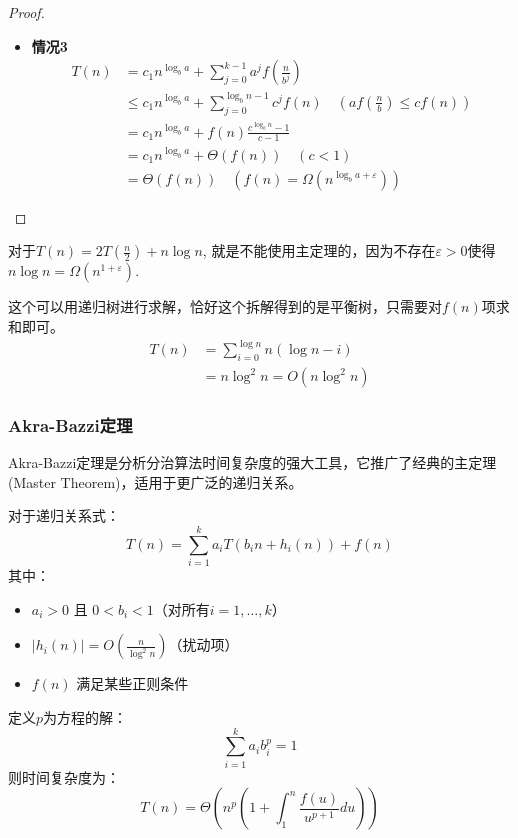\documentclass[./../main.tex]{subfiles} %
\begin{document}
\begin{proof}
\begin{itemize}
        \begin{align*}
            T(n) &= c_{1}n^{\log_{b}a} + \sum_{j=0}^{k-1} a^{j}f\left(\frac{n}{b^{j}}\right) \\
            &= c_{1}n^{\log_{b}a} + \Theta\left(\sum_{j=0}^{\log_{b}n-1} a^{j}\left(\frac{n}{b^{j}}\right)^{\log_{b}a}\right) \\
            &= c_{1}n^{\log_{b}a} + \Theta\left(n^{\log_{b}a}\sum_{j=0}^{\log_{b}n-1} \frac{a^{j}}{a^{j}}\right) \\
            &= c_{1}n^{\log_{b}a} + \Theta\left(n^{\log_{b}a}\log n\right) \\
            &= \Theta\left(n^{\log_{b}a}\log n\right)
        \end{align*}
        \item \textbf{情况3}
        \begin{align*}
            T(n) &= c_{1}n^{\log_{b}a} + \sum_{j=0}^{k-1} a^{j}f\left(\frac{n}{b^{j}}\right) \\
            &\leq c_{1}n^{\log_{b}a} + \sum_{j=0}^{\log_{b}n-1}c^{j}f(n) \quad \left(a f\left(\frac{n}{b}\right)\leq cf(n)\right) \\
            &= c_{1}n^{\log_{b}a} + f(n)\frac{c^{\log_{b}n}-1}{c-1} \\
            &= c_{1}n^{\log_{b}a} + \Theta(f(n)) \quad (c < 1) \\
            &= \Theta(f(n)) \quad \left(f(n)=\Omega\left(n^{\log_{b}a+\varepsilon}\right)\right)
        \end{align*}
    \end{itemize}
\end{proof}

对于$T(n)=2T(\frac{n}{2})+n\log n$, 就是不能使用主定理的，因为不存在$\varepsilon>0$使得$n\log n=\Omega(n^{1+\varepsilon})$.

这个可以用递归树进行求解，恰好这个拆解得到的是平衡树，只需要对$f(n)$项求和即可。
\begin{align*}
    T(n)&=\sum_{i=0}^{\log n}n(\log n-i)\\
    &=n\log^2n=O(n\log^2n)
\end{align*}

\subsubsection{Akra-Bazzi定理}
Akra-Bazzi定理是分析分治算法时间复杂度的强大工具，它推广了经典的主定理(Master Theorem)，适用于更广泛的递归关系。

对于递归关系式：
$$ T(n) = \sum_{i=1}^{k} a_iT(b_in + h_i(n)) + f(n) $$
其中：
\begin{itemize}
\item $a_i > 0$ 且 $0 < b_i < 1$（对所有$i=1,\ldots,k$）
\item $|h_i(n)| = O\left(\frac{n}{\log^2 n}\right)$（扰动项）
\item $f(n)$ 满足某些正则条件
\end{itemize}
定义$p$为方程的解：
$$ \sum_{i=1}^{k} a_ib_i^p = 1 $$
则时间复杂度为：
$$ T(n) = \Theta\left(n^p\left(1 + \int_1^n \frac{f(u)}{u^{p+1}}du\right)\right) $$
\end{document}
